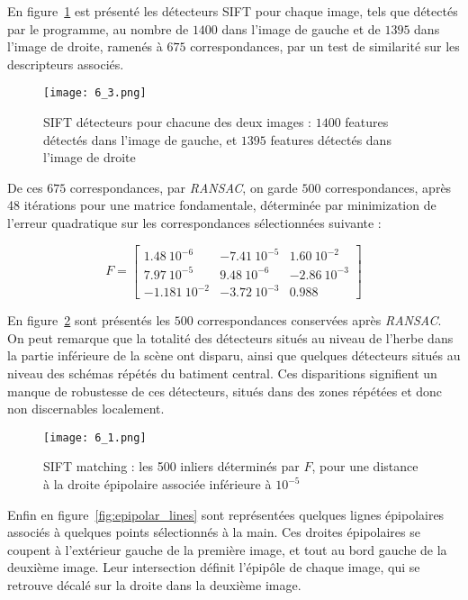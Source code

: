 \documentclass[12pt,a4paper,onecolumn]{article}
\begin{document}
En figure~\ref{fig:sift} est présenté les détecteurs SIFT pour chaque image, tels que détectés par le programme, au nombre de \( 1400 \) dans l'image de gauche et de \( 1395 \) dans l'image de droite, ramenés à \( 675 \) correspondances, par un test de similarité sur les descripteurs associés.

\begin{figure}[H]
	\centering
	\texttt{[image: 6\_3.png]}
	\caption{SIFT détecteurs pour chacune des deux images : \( 1400 \) features détectés dans l'image de gauche, et \( 1395 \) features détectés dans l'image de droite}
	\label{fig:sift}
\end{figure}

De ces \( 675 \) correspondances, par \textit{RANSAC}, on garde \( 500 \) correspondances, après 48 itérations pour une matrice fondamentale, déterminée par minimization de l'erreur quadratique sur les correspondances sélectionnées suivante :

\[
	F=
	\begin{bmatrix}
		1.48~10^{-6}   & -7.41~10^{-5} & 1.60~10^{-2}  \\
		7.97~10^{-5}   & 9.48~10^{-6}  & -2.86~10^{-3} \\
		-1.181~10^{-2} & -3.72~10^{-3} & 0.988
	\end{bmatrix}
\]

En figure~\ref{fig:sift_inliers} sont présentés les \(500\) correspondances conservées après \textit{RANSAC}. On peut remarque que la totalité des détecteurs situés au niveau de l'herbe dans la partie inférieure de la scène ont disparu, ainsi que quelques détecteurs situés au niveau des schémas répétés du batiment central. Ces disparitions signifient un manque de robustesse de ces détecteurs, situés dans des zones répétées et donc non discernables localement.

\begin{figure}[H]
	\centering
	\texttt{[image: 6\_1.png]}
	\caption{SIFT matching : les 500 inliers déterminés par \(F\), pour une distance à la droite épipolaire associée inférieure à \(10^{-5}\)}
	\label{fig:sift_inliers}
\end{figure}

Enfin en figure~\ref{fig:epipolar_lines} sont représentées quelques lignes épipolaires associés à quelques points sélectionnés à la main. Ces droites épipolaires se coupent à l'extérieur gauche de la première image, et tout au bord gauche de la deuxième image. Leur intersection définit l'épipôle de chaque image, qui se retrouve décalé sur la droite dans la deuxième image.
\end{document}
